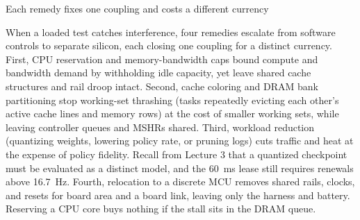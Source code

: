 \documentclass[aspectratio=169, 12pt]{beamer}
\begin{document}
\begin{frame}{Each remedy fixes one coupling and costs a different currency}
{  When a loaded test catches interference, four remedies escalate from software controls to separate silicon, each closing one coupling for a distinct currency. First, CPU reservation and memory-bandwidth caps bound compute and bandwidth demand by withholding idle capacity, yet leave shared cache structures and rail droop intact. Second, cache coloring and DRAM bank partitioning stop working-set thrashing (tasks repeatedly evicting each other's active cache lines and memory rows) at the cost of smaller working sets, while leaving controller queues and MSHRs shared. Third, workload reduction (quantizing weights, lowering policy rate, or pruning logs) cuts traffic and heat at the expense of policy fidelity. Recall from Lecture 3 that a quantized checkpoint must be evaluated as a distinct model, and the 60~ms lease still requires renewals above 16.7~Hz. Fourth, relocation to a discrete MCU removes shared rails, clocks, and resets for board area and a board link, leaving only the harness and battery. Reserving a CPU core buys nothing if the stall sits in the DRAM queue.

}
\end{frame}
\end{document}
